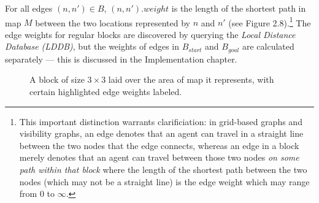 \documentclass[12pt,notitlepage]{report}
\begin{document}
\noindent For all edges $(n,n') \in B$, $(n,n').weight$ is the length of the shortest path in map $M$ between the two locations represented by $n$ and $n'$ (see Figure 2.8).\footnote{This important distinction warrants clarificiation: in grid-based graphs and visibility graphs, an edge denotes that an agent can travel in a straight line between the two nodes that the edge connects, whereas an edge in a block merely denotes that an agent can travel between those two nodes {\em on some path within that block} where the length of the shortest path between the two nodes (which may not be a straight line) is the edge weight which may range from $0$ to $\infty$.} The edge weights for regular blocks are discovered by querying the {\em Local Distance Database (LDDB)}, but the weights of edges in $B_{start}$ and $B_{goal}$ are calculated separately --- this is discussed in the Implementation chapter.\\

\begin{figure}
    \centering
    \caption[Anatomy of a block]{A block of size $3 \times 3$ laid over the area of map it represents, with certain highlighted edge weights labeled.}
\end{figure}
\end{document}
